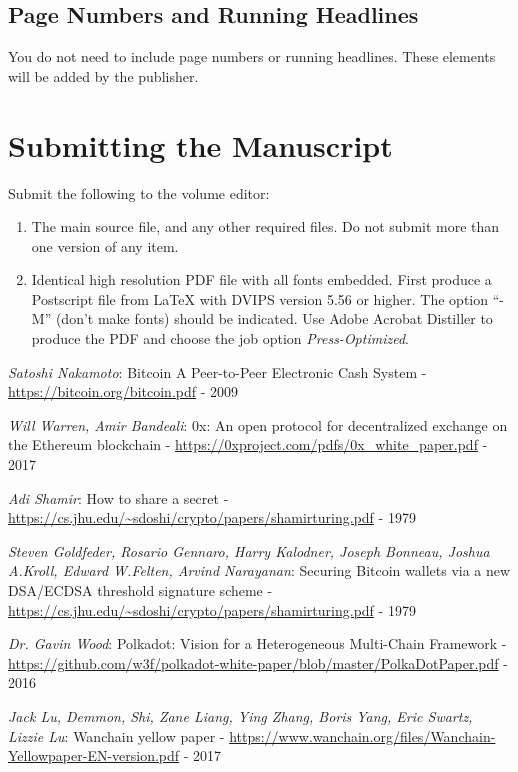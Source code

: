 \documentclass{Bigpool}
\begin{document}
\subsection{Page Numbers and Running Headlines}
You do not need to include page numbers or running headlines. These elements will be
added by the publisher.

\section{Submitting the Manuscript}
Submit the following to the volume editor:

\begin{enumerate}
\item The main source file, and any other required files. Do not submit more than
one version of any item.

\item Identical high resolution PDF file with all fonts embedded. First produce a
Postscript file from \LaTeX{} with DVIPS version 5.56 or higher. The option
``-M'' (don't make fonts) should be indicated. Use Adobe Acrobat Distiller to
produce the PDF and choose the job option \textit{Press-Optimized}.
\end{enumerate}


\begin{thebibliography}{99}
	\textit{Satoshi Nakamoto}: Bitcoin A Peer-to-Peer Electronic Cash System - \url{https://bitcoin.org/bitcoin.pdf} - 2009

	\textit{Will Warren, Amir Bandeali}: 0x: An open protocol for decentralized exchange on the Ethereum blockchain - \url{https://0xproject.com/pdfs/0x_white_paper.pdf} - 2017

	\textit{Adi Shamir}: How to share a secret - \url{https://cs.jhu.edu/~sdoshi/crypto/papers/shamirturing.pdf} - 1979

	\textit{Steven Goldfeder, Rosario Gennaro, Harry Kalodner, Joseph Bonneau, Joshua A.Kroll, Edward W.Felten, Arvind Narayanan}: Securing Bitcoin wallets via a new DSA/ECDSA threshold signature scheme - \url{https://cs.jhu.edu/~sdoshi/crypto/papers/shamirturing.pdf} - 1979

	\textit{Dr. Gavin Wood}: Polkadot: Vision for a Heterogeneous Multi-Chain Framework - \url{https://github.com/w3f/polkadot-white-paper/blob/master/PolkaDotPaper.pdf} - 2016

	\textit{Jack Lu, Demmon, Shi, Zane Liang, Ying Zhang, Boris Yang, Eric Swartz, Lizzie Lu}: Wanchain yellow paper - \url{https://www.wanchain.org/files/Wanchain-Yellowpaper-EN-version.pdf} - 2017
\end{thebibliography}
\end{document}
